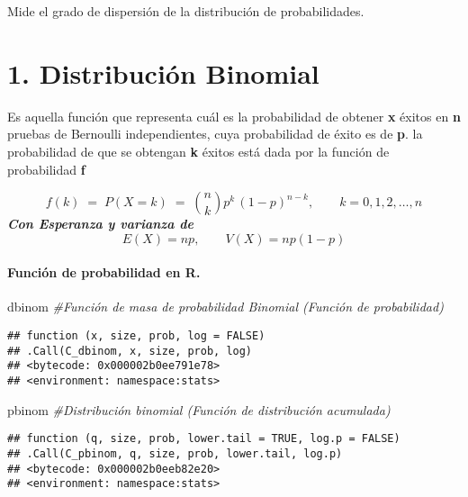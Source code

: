 \documentclass[
]{article}
\newenvironment{Shaded}{\begin{snugshade}}{\end{snugshade}}
\newcommand{\CommentTok}[1]{\textcolor[rgb]{0.56,0.35,0.01}{\textit{#1}}}
\newcommand{\NormalTok}[1]{#1}
\begin{document}
\pagebreak

Mide el grado de dispersión de la distribución de probabilidades.

\hypertarget{distribuciuxf3n-binomial}{%
\section{1. Distribución Binomial}\label{distribuciuxf3n-binomial}}

Es aquella función que representa cuál es la probabilidad de obtener
\textbf{x} éxitos en \textbf{n} pruebas de Bernoulli independientes,
cuya probabilidad de éxito es de \textbf{p}. \pagebreak la probabilidad
de que se obtengan \textbf{k} éxitos está dada por la función de
probabilidad \textbf{f}

\[f(k) \;=\; P(X=k)  \;=\; {n\choose k} p^k\, (1-p)^{n-k}, \qquad k=0,1,2, \ldots, n\]
\textbf{\emph{Con Esperanza y varianza de}}
\[E(X)= np, \qquad V(X)= np(1-p)\]

\hypertarget{funciuxf3n-de-probabilidad-en-r.}{%
\paragraph{Función de probabilidad en
R.}\label{funciuxf3n-de-probabilidad-en-r.}}

\begin{Shaded}
\begin{Highlighting}[]
\NormalTok{dbinom }\CommentTok{\#Función de masa de probabilidad Binomial (Función de probabilidad)}
\end{Highlighting}
\end{Shaded}

\begin{verbatim}
## function (x, size, prob, log = FALSE) 
## .Call(C_dbinom, x, size, prob, log)
## <bytecode: 0x000002b0ee791e78>
## <environment: namespace:stats>
\end{verbatim}

\begin{Shaded}
\begin{Highlighting}[]
\NormalTok{pbinom }\CommentTok{\#Distribución binomial (Función de distribución acumulada)}
\end{Highlighting}
\end{Shaded}

\begin{verbatim}
## function (q, size, prob, lower.tail = TRUE, log.p = FALSE) 
## .Call(C_pbinom, q, size, prob, lower.tail, log.p)
## <bytecode: 0x000002b0eeb82e20>
## <environment: namespace:stats>
\end{verbatim}
\end{document}
